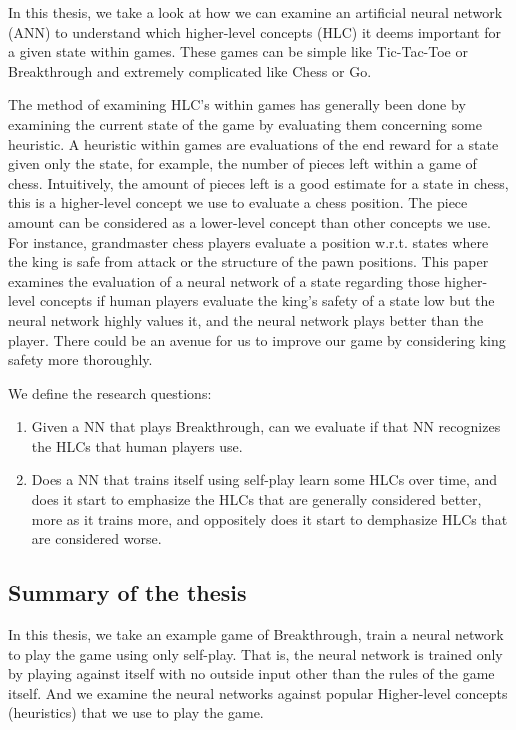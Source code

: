In this thesis, we take a look at how we can examine an artificial neural network (ANN)
to understand which higher-level concepts (HLC) it deems important for a given state
within games. These games can be simple like Tic-Tac-Toe or Breakthrough and extremely
complicated like Chess or Go.

The method of examining HLC's within games has generally been done by examining the
current state of the game by evaluating them concerning some heuristic. A heuristic within games are evaluations of the end reward for a state given only the state, for example,
the number of pieces left within a game of chess. Intuitively, the amount of pieces
left is a good estimate for a state in chess, this is a higher-level concept we
use to evaluate a chess position. The piece amount can be considered as a lower-level concept
than other concepts we use. For instance, grandmaster chess players evaluate a position w.r.t. states
where the king is safe from attack or the structure of the pawn positions.
This paper examines the evaluation of a neural network of a state regarding those higher-level concepts if human players evaluate the king's safety of a state
low but the neural network highly values it, and the neural network plays better
than the player. There could be an avenue for us to improve our game by considering king safety more thoroughly.

We define the research questions:

\begin{enumerate}
      \item Given a NN that plays Breakthrough, can we evaluate if that NN recognizes the
            HLCs that human players use.
      \item Does a NN that trains itself using self-play learn some HLCs over time, and does it start to emphasize
            the HLCs that are generally considered better, more as it trains more, and oppositely does it start to
            demphasize HLCs that are considered worse.
\end{enumerate}

\subsection{Summary of the thesis}

In this thesis, we take an example game of Breakthrough, train a neural network to play the game using only self-play. That is, the neural network is trained only by playing against itself with no outside input other than the rules of the game itself. And we examine the neural networks against popular Higher-level concepts (heuristics) that we use to play the game.
